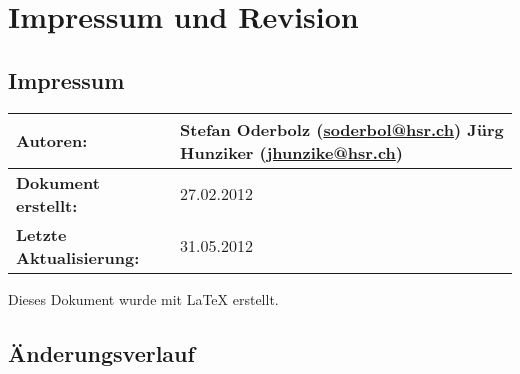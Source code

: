 \chapter*{Impressum und Revision}

\section*{Impressum}
\begin{table}[H] 
\centering 
\begin{tabular}{|p{0.35\twocelltabwidth}|p{0.65\twocelltabwidth}|}
\hline 
\textbf{Autoren:} & Stefan Oderbolz (\url{soderbol@hsr.ch}) \newline
Jürg Hunziker (\url{jhunzike@hsr.ch}) \\ 
\hline 
\textbf{Dokument erstellt:} & 27.02.2012 \\ 
\hline 
\textbf{Letzte Aktualisierung:} & 31.05.2012 \\ 
\hline 
\end{tabular}
\end{table}

Dieses Dokument wurde mit \LaTeX{} erstellt.

\section*{Änderungsverlauf}

